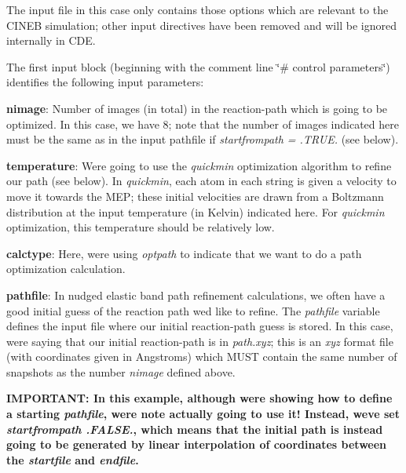 The input file in this case only contains those options which are relevant to the C\+I\+N\+EB simulation; other input directives have been removed and will be ignored internally in C\+DE.

The first input block (beginning with the comment line \char`\"{}\# control parameters\char`\"{}) identifies the following input parameters\+:
\begin{DoxyItemize}
\item {\bfseries nimage}\+: Number of images (in total) in the reaction-\/path which is going to be optimized. In this case, we have 8; note that the number of images indicated here must be the same as in the input pathfile if {\itshape startfrompath = .T\+R\+UE.} (see below).
\item {\bfseries temperature}\+: We\textquotesingle{}re going to use the {\itshape quickmin} optimization algorithm to refine our path (see below). In {\itshape quickmin}, each atom in each string is given a velocity to move it towards the M\+EP; these initial velocities are drawn from a Boltzmann distribution at the input temperature (in Kelvin) indicated here. For {\itshape quickmin} optimization, this temperature should be relatively low.
\item {\bfseries calctype}\+: Here, we\textquotesingle{}re using {\itshape optpath} to indicate that we want to do a path optimization calculation.
\item {\bfseries pathfile}\+: In nudged elastic band path refinement calculations, we often have a good initial guess of the reaction path we\textquotesingle{}d like to refine. The {\itshape pathfile} variable defines the input file where our initial reaction-\/path guess is stored. In this case, we\textquotesingle{}re saying that our initial reaction-\/path is in {\itshape path.\+xyz}; this is an {\itshape xyz} format file (with coordinates given in Angstroms) which M\+U\+ST contain the same number of snapshots as the number {\itshape nimage} defined above.
\end{DoxyItemize}

{\bfseries I\+M\+P\+O\+R\+T\+A\+NT\+: In this example, although we\textquotesingle{}re showing how to define a starting {\itshape pathfile}, we\textquotesingle{}re note actually going to use it! Instead, we\textquotesingle{}ve set {\itshape startfrompath .F\+A\+L\+SE.}, which means that the initial path is instead going to be generated by linear interpolation of coordinates between the {\itshape startfile} and {\itshape endfile}.}


